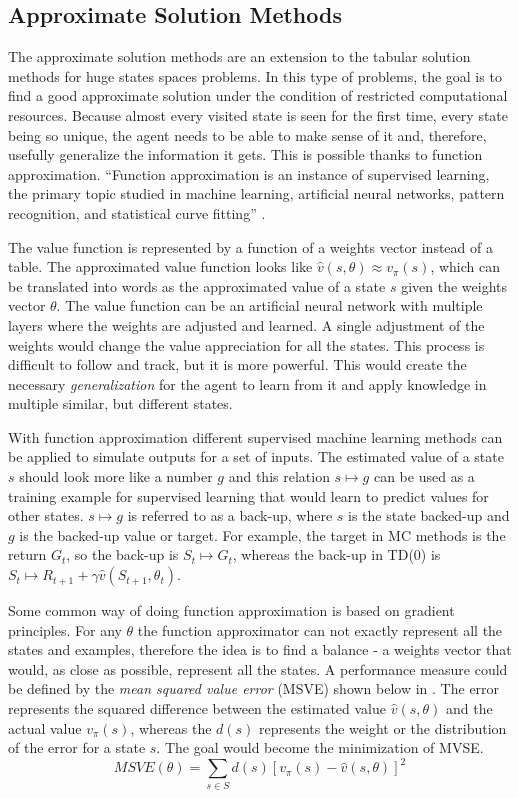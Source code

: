 \subsection{Approximate Solution Methods}\label{Approximate solution methods}
The approximate solution methods are an extension to the tabular solution methods for huge states spaces problems. In this type of problems, the goal is to find a good approximate solution under the condition of restricted computational resources. Because almost every visited state is seen for the first time, every state being so unique, the agent needs to be able to make sense of it and, therefore, usefully generalize the information it gets. This is possible thanks to function approximation. “Function approximation is an instance of supervised learning, the primary topic studied in machine learning, artificial neural networks, pattern recognition, and statistical curve fitting” \cite{Sutton}.

The value function is represented by a function of a weights vector instead of a table. The approximated value function looks like $\hat{v}(s,\theta)\approx v_{\pi}(s)$, which can be translated into words as the approximated value of a state $s$ given the weights vector $\theta$. The value function can be an artificial neural network with multiple layers where the weights are adjusted and learned. A single adjustment of the weights would change the value appreciation for all the states. This process is difficult to follow and track, but it is more powerful. This would create the necessary \textit{generalization} for the agent to learn from it and apply knowledge in multiple similar, but different states.

With function approximation different supervised machine learning methods can be applied to simulate outputs for a set of inputs. The estimated value of a state $s$ should look more like a number $g$ and this relation $s \mapsto g$ can be used as a training example for supervised learning that would learn to predict values for other states. $s \mapsto g$ is referred to as a back-up, where $s$ is the state backed-up and $g$ is the backed-up value or target. For example, the target in MC methods is the return $G_{t}$, so the back-up is $S_{t} \mapsto G_{t}$, whereas the back-up in TD(0) is $S_{t} \mapsto R_{t+1}+\gamma\hat{v}(S_{t+1}, \theta_{t}) $.

Some common way of doing function approximation is based on gradient principles. For any $\theta$ the function approximator can not exactly represent all the states and examples, therefore the idea is to find a balance - a weights vector that would, as close as possible, represent all the states. A performance measure could be defined by the \textit{mean squared value error} (MSVE) shown below in . The error represents the squared difference between the estimated value $\hat{v}(s,\theta)$ and the actual value $v_{\pi}(s)$, whereas the $d(s)$ represents the weight or the distribution of the error for a state $s$. The goal would become the minimization of MVSE.
\begin{equation}\label{MSVE}
MSVE(\theta)=\sum_{s\in S} d(s) \left [ v_{\pi}(s) - \hat{v}(s,\theta) \right ]^{2}
\end{equation}

